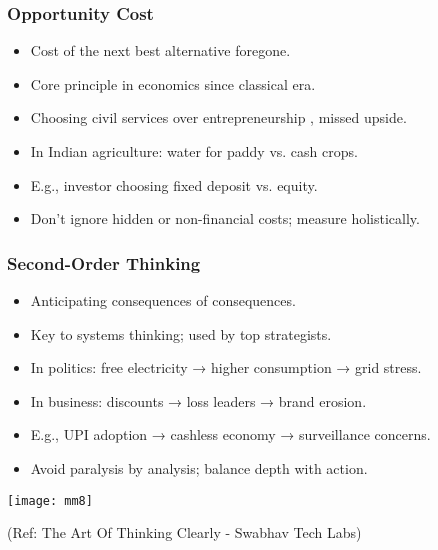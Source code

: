 \begin{frame}[fragile]\frametitle{Opportunity Cost}
  \begin{itemize}
    \item Cost of the next best alternative foregone.
    \item Core principle in economics since classical era.
    \item Choosing civil services over entrepreneurship , missed upside.
    \item In Indian agriculture: water for paddy vs. cash crops.
    \item E.g., investor choosing fixed deposit vs. equity.
    \item Don't ignore hidden or non-financial costs; measure holistically.
  \end{itemize}
\end{frame}

\begin{frame}[fragile]\frametitle{Second-Order Thinking}
  \begin{itemize}
    \item Anticipating consequences of consequences.
    \item Key to systems thinking; used by top strategists.
    \item In politics: free electricity → higher consumption → grid stress.
    \item In business: discounts → loss leaders → brand erosion.
    \item E.g., UPI adoption → cashless economy → surveillance concerns.
    \item Avoid paralysis by analysis; balance depth with action.
  \end{itemize}
  
	\begin{center}
	\texttt{[image: mm8]}
	\end{center}
	
{\tiny (Ref: The Art Of Thinking Clearly - Swabhav Tech Labs)}      
\end{frame}

